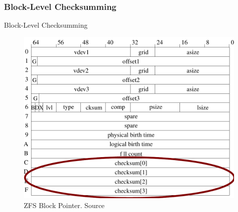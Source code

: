 \subsubsection{Block-Level Checksumming}
\begin{frame}{Block-Level Checksumming}
	\begin{figure}
		\centering
		\includegraphics[height=0.75\textheight]{assets/on_disk/block_pointer_checksum_highlighted}
		\caption{ZFS Block Pointer. Source \cite{introimplzfs}}
	\end{figure}
\end{frame}

